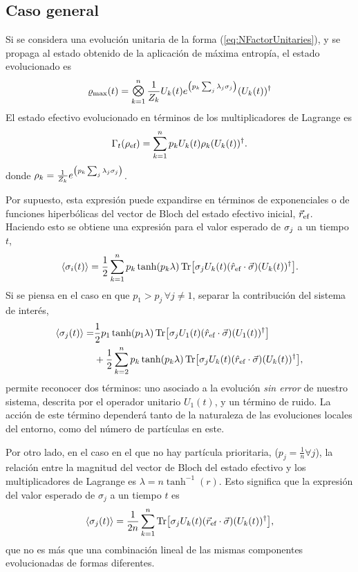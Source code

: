 \subsection{Caso general}

Si se considera una evolución unitaria de la forma (\ref{eq:NFactorUnitaries}), y se propaga al estado obtenido de la aplicación de máxima entropía, el estado evolucionado es
\begin{equation}
    \varrho_{\max}(t)=\Motimes_{k=1}^{n}\frac{1}{Z_{k}}U_{k}(t) e^{\qty(p_{k}\sum_{j}\lambda_{j}\pauli{j})} (U_{k}(t))^{\dag}\nonumber
\end{equation}
El estado efectivo evolucionado en términos de los multiplicadores de Lagrange es
\begin{equation}\label{eq:SeparableEvolution}
    \Gamma_{t}(\rho_{\text{ef}})=\sum_{k=1}^{n}p_{k} U_{k}(t) \rho_{k} (U_{k}(t))^{\dag}.
\end{equation}
donde $\rho_{k}=\frac{1}{Z_{k}}e^{\qty(p_{k}\sum_{j}\lambda_{j}\sigma_{j})}$. 

Por supuesto, esta expresión puede expandirse en términos de exponenciales o de funciones hiperbólicas del vector de Bloch del estado efectivo inicial, $\vec{r}_{\text{ef}}$. Haciendo esto se obtiene una expresión para el valor esperado de $\sigma_{j}$ a un tiempo $t$,
\begin{equation}\label{eq:SeparableEvolutionExpVal}
    \expval{\sigma_{i}(t)}=\frac{1}{2}\sum_{k=1}^{n}p_{k}\tanh(p_{k}\lambda)\Tr[\sigma_{j}U_{k}(t) (\hat{r}_{\text{ef}}\cdot\vec{\sigma}) (U_{k}(t))^{\dag}].
\end{equation}
Si se piensa en el caso en que $p_{1}>p_{j}\,\forall j\neq 1$, separar la contribución del sistema de interés,
\begin{align}
    \expval{\sigma_{j}(t)}=&\frac{1}{2}p_{1}\tanh(p_{1}\lambda)\Tr[\sigma_{j}U_{1}(t) (\hat{r}_{\text{ef}}\cdot\vec{\sigma}) (U_{1}(t))^{\dag}]\nonumber\\
    &+\frac{1}{2}\sum_{k=2}^{n}p_{k}\tanh(p_{k}\lambda)\Tr[\sigma_{j}U_{k}(t) (\hat{r}_{\text{ef}}\cdot\vec{\sigma}) (U_{k}(t))^{\dag}]\nonumber,
\end{align}
permite reconocer dos términos: uno asociado a la evolución \textit{sin error} de nuestro sistema, descrita por el operador unitario $U_{1}(t)$, y un término de ruido. La acción de este término dependerá tanto de la naturaleza de las evoluciones locales del entorno, como del número de partículas en este.


Por otro lado, en el caso en el que no hay partícula prioritaria, \ie ($p_{j}=\frac{1}{n}\forall j$), la relación entre la magnitud del vector de Bloch del estado efectivo y los multiplicadores de Lagrange es $\lambda=n\tanh^{-1}(r)$. Esto significa que la expresión del valor esperado de $\sigma_{j}$ a un tiempo $t$ es
\begin{equation}
    \expval{\sigma_{j}(t)}=\frac{1}{2n}\sum_{k=1}^{n}\Tr[\sigma_{j}U_{k}(t) (\vec{r}_{\text{ef}}\cdot\vec{\sigma}) (U_{k}(t))^{\dag}],\nonumber
\end{equation}
que no es más que una combinación lineal de las mismas componentes evolucionadas de formas diferentes.

